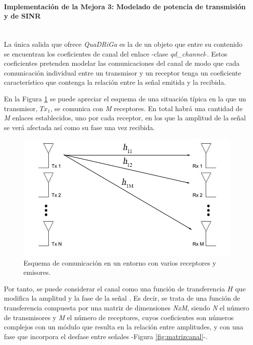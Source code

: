 \paragraph{Implementación de la Mejora 3: Modelado de potencia de transmisión y de SINR} \mbox{} \\

La única salida que ofrece \textit{QuaDRiGa} es la de un objeto que entre su contenido se encuentran los coeficientes de canal del enlace -clase \textit{qd\_channel}-.  Estos coeficientes pretenden modelar las comunicaciones del canal de modo que cada comunicación individual entre un transmisor y un receptor tenga un coeficiente característico que contenga la relación entre la señal emitida y la recibida.

En la Figura \ref{fig:esquema_comunicacion} se puede apreciar el esquema de una situación típica en la que un transmisor, $Tx_1$, se comunica con \textit{M} receptores. En total habrá una cantidad de \textit{M} enlaces establecidos, uno por cada receptor, en los que la amplitud de la señal se verá afectada así como su fase una vez recibida.

\begin{figure}[h!]
	\centering
    \includegraphics[width=0.85\linewidth]{imagenes/esquema_comunicacion.png}
	\caption{Esquema de comunicación en un entorno con varios receptores y emisores.}
	\label{fig:esquema_comunicacion}
\end{figure}

Por tanto, se puede considerar el canal como una función de transferencia $H$ que modifica la amplitud y la fase de la señal \cite{modelado}. Es decir, se trata de una función de transferencia compuesta por una matriz de dimensiones \textit{NxM}, siendo \textit{N} el número de transmisores y \textit{M} el número de receptores, cuyos coeficientes son números complejos con un módulo que resulta en la relación entre amplitudes, y con una fase que incorpora el desfase entre señales -Figura \ref{fig:matrizcanal}-.

